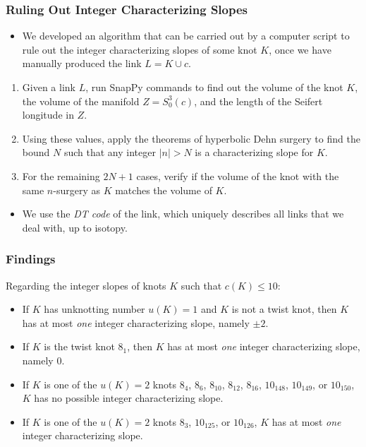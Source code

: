 \documentclass{beamer}
\theoremstyle{ex}
\theoremstyle{rem}
\begin{document}
	\begin{frame}
	\frametitle{Ruling Out Integer Characterizing Slopes}
	\begin{itemize}
		\item We developed an algorithm that can be carried out by a computer script to rule out the integer characterizing slopes of some knot $K$, once we have manually produced the link $L = K \cup c$.
	\end{itemize}
	\begin{enumerate}
		\item Given a link $L$, run SnapPy commands to find out the volume of the knot $K$, the volume of the manifold $Z = S_0^3(c)$, and the length of the Seifert longitude in $Z$.
		\item Using these values, apply the theorems of hyperbolic Dehn surgery to find the bound $N$ such that any integer $|n| > N$ is a characterizing slope for $K$.
		\item  For the remaining $2N + 1$ cases, verify if the volume of the knot with the same $n$-surgery as $K$ matches the volume of $K$.
	\end{enumerate}
	\begin{itemize}
		\item We use the \textit{DT code} of the link, which uniquely describes all links that we deal with, up to isotopy.
	\end{itemize}
\end{frame}

\begin{frame}
\frametitle{Findings}
\begin{theorem}
	Regarding the integer slopes of knots $K$ such that $c(K) \leq 10$:
	\begin{itemize}
		\item If $K$ has unknotting number $u(K) = 1$ and $K$ is not a twist knot, then $K$ has at most \textit{one} integer characterizing slope, namely $\pm 2$.
		\item If $K$ is the twist knot $8_1$, then $K$ has at most \textit{one} integer characterizing slope, namely $0$.
		\item If $K$ is one of the $u(K) = 2$ knots $8_4$, $8_6$, $8_{10}$, $8_{12}$, $8_{16}$, $10_{148}$, $10_{149}$, or $10_{150}$, $K$ has no possible integer characterizing slope.
		\item If $K$ is one of the $u(K) = 2$ knots $8_3$, $10_{125}$, or $10_{126}$, $K$ has at most \textit{one} integer characterizing slope.
	\end{itemize}
\end{theorem}
\end{frame}
\end{document}
